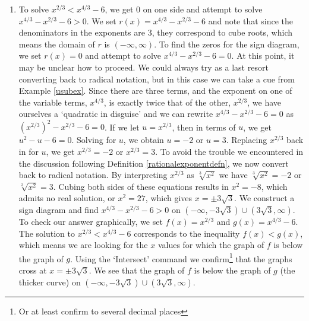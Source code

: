 {
\begin{enumerate}

\item  To solve $x^{2/3} < x^{4/3} - 6$, we get $0$ on one side and attempt to solve $x^{4/3} - x^{2/3} - 6 > 0$.  We set $r(x) = x^{4/3} - x^{2/3} - 6$ and note that since the denominators in the exponents are $3$, they correspond to cube roots, which means the domain of $r$ is $(-\infty, \infty)$. To find the zeros for the sign diagram, we set $r(x) = 0$ and attempt to solve $x^{4/3} - x^{2/3} - 6 = 0$.  At this point, it may be unclear how to proceed.  We could always try as a last resort converting back to radical notation,  but in this case we can take a cue from Example \ref{usubex}.  Since there are three terms, and the exponent on one of the variable terms, $x^{4/3}$, is exactly twice that of the other, $x^{2/3}$, we have ourselves a `quadratic in disguise' and we can rewrite  $ x^{4/3} - x^{2/3} - 6 = 0$ as $\left(x^{2/3}\right)^2 - x^{2/3} - 6=0$.  If we let $u = x^{2/3}$, then in terms of $u$, we get $u^2 - u - 6 = 0$.  Solving for $u$, we obtain $u = -2$ or $u = 3$.  Replacing $x^{2/3}$ back in for $u$, we get $x^{2/3} = -2$ or $x^{2/3} = 3$.  To avoid the trouble we encountered in the discussion following Definition \ref{rationalexponentdefn}, we now convert back to radical notation.  By interpreting $x^{2/3}$ as $\sqrt[3]{x^2}$ we have $\sqrt[3]{x^2} = -2$ or $\sqrt[3]{x^2}= 3$.  Cubing both sides of these equations results in $x^2 = -8$, which admits no real solution, or $x^2 = 27$, which gives $x = \pm 3 \sqrt{3}$.  We construct a sign diagram and find $x^{4/3} - x^{2/3} - 6 > 0$ on $\left(-\infty, -3 \sqrt{3}\right)\cup \left(3 \sqrt{3}, \infty\right)$.  To check our answer graphically, we set $f(x) = x^{2/3}$ and $g(x) = x^{4/3}-6$.  The solution to  $x^{2/3} < x^{4/3} - 6$ corresponds to the inequality $f(x) < g(x)$, which means we are looking for the $x$ values for which the graph of $f$ is below the graph of $g$.  Using the `Intersect' command we confirm\footnote{Or at least confirm to several decimal places} that the graphs cross at $x= \pm 3\sqrt{3}$.  We see that the graph of $f$ is below the graph of $g$ (the thicker curve) on $\left(-\infty, -3 \sqrt{3}\right)\cup \left(3 \sqrt{3}, \infty\right)$.


\end{enumerate}}
